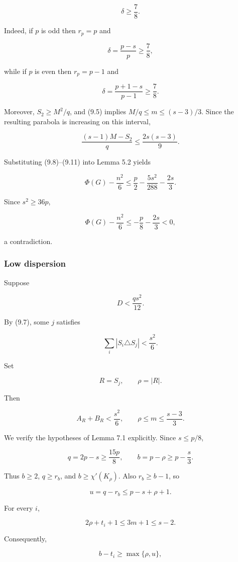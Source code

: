 \documentclass[11pt,a4paper]{article}
\begin{document}
\[
\boxed{\delta\ge\frac78.}
\tag{9.10}
\]

Indeed, if \(p\) is odd then \(r_p=p\) and

\[
\delta=\frac{p-s}{p}\ge\frac78,
\]

while if \(p\) is even then \(r_p=p-1\) and

\[
\delta=\frac{p+1-s}{p-1}\ge\frac78.
\]

Moreover, \(S_2\ge M^2/q\), and (9.5) implies \(M/q\le m\le(s-3)/3\). Since the resulting parabola is increasing on this interval,

\[
\frac{(s-1)M-S_2}{q}
\le
\frac{2s(s-3)}9.
\tag{9.11}
\]

Substituting (9.8)--(9.11) into Lemma 5.2 yields

\[
\Phi(G)-\frac{n^2}{6}
\le
\frac p2-\frac{5s^2}{288}-\frac{2s}{3}.
\tag{9.12}
\]

Since \(s^2\ge36p\),

\[
\Phi(G)-\frac{n^2}{6}
\le
-\frac p8-\frac{2s}{3}<0,
\]

a contradiction.

\subsubsection{Low dispersion}\label{low-dispersion}

Suppose

\[
D<\frac{qs^2}{12}.
\tag{9.13}
\]

By (9.7), some \(j\) satisfies

\[
\sum_i|S_i\triangle S_j|
<
\frac{s^2}{6}.
\tag{9.14}
\]

Set

\[
R=S_j,
\qquad
\rho=|R|.
\]

Then

\[
A_R+B_R<\frac{s^2}{6},
\qquad
\rho\le m\le\frac{s-3}{3}.
\tag{9.15}
\]

We verify the hypotheses of Lemma 7.1 explicitly. Since \(s\le p/8\),

\[
q=2p-s\ge\frac{15p}{8},
\qquad
b=p-\rho\ge p-\frac s3.
\]

Thus \(b\ge2\), \(q\ge r_b\), and \(b\ge\chi'(K_\rho)\). Also \(r_b\ge b-1\), so

\[
u=q-r_b\le p-s+\rho+1.
\]

For every \(i\),

\[
2\rho+t_i+1
\le
3m+1
\le
s-2.
\]

Consequently,

\[
b-t_i\ge\max\{\rho,u\},
\]
\end{document}
